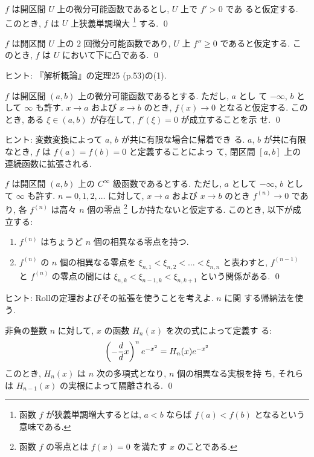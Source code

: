 \documentclass[12pt,twoside]{jarticle}
\begin{document}
\begin{question}
  $f$ は開区間 $U$ 上の微分可能函数であるとし, $U$ 上で $f' > 0$ であ
  ると仮定する. このとき, $f$ は $U$ 上狭義単調増大%
  \footnote{函数 $f$ が狭義単調増大するとは, $a < b$ ならば $f(a) <
    f(b)$ となるという意味である.}%
  する. \qed
\end{question}

\begin{question}
  $f$ は開区間 $U$ 上の $2$ 回微分可能函数であり, $U$ 上 $f'' \ge 0$ %
  であると仮定する. このとき, $f$ は $U$ において下に凸である. \qed
\end{question}

\noindent ヒント: 『解析概論』の定理25 (p.53)の(1).

\begin{question}[Rollの定理の拡張]
  $f$ は開区間 $(a,b)$ 上の微分可能函数であるとする. ただし, $a$ とし
  て $-\infty$, $b$ として $\infty$ も許す. 
  $x\to a$ および $x\to b$ のとき, $f(x)\to 0$ となると仮定する. この
  とき, ある $\xi\in(a,b)$ が存在して, $f'(\xi)=0$ が成立することを示
  せ. \qed
\end{question}

\noindent ヒント: 変数変換によって $a$, $b$ が共に有限な場合に帰着でき
る. $a$, $b$ が共に有限なとき, $f$ は $f(a)=f(b)=0$ と定義することによっ
て, 閉区間 $[a,b]$ 上の連続函数に拡張される.

\begin{question}\qstar{*}
  $f$ は開区間 $(a,b)$ 上の $C^\infty$ 級函数であるとする. ただし, $a$ 
  として $-\infty$, $b$ として $\infty$ も許す. %
  $n=0,1,2,\ldots$ に対して, $x\to a$ および $x\to b$ のとき %
  $f^{(n)} \to 0$ であり, 各 $f^{(n)}$ は高々 $n$ 個の零点%
  \footnote{函数 $f$ の零点とは $f(x)=0$ を満たす $x$ のことである.}%
  しか持たないと仮定する. このとき, 以下が成立する:
  \begin{enumerate}
  \item $f^{(n)}$ はちょうど $n$ 個の相異なる零点を持つ.
  \item $f^{(n)}$ の $n$ 個の相異なる零点を %
    $\xi_{n,1} < \xi_{n,2} < \dots < \xi_{n,n}$ と表わすと,
    $f^{(n-1)}$ と $f^{(n)}$ の零点の間には %
    $\xi_{n,k} < \xi_{n-1,k} < \xi_{n,k+1}$ という関係がある.  \qed
  \end{enumerate}
\end{question}

\noindent ヒント: Rollの定理およびその拡張を使うことを考えよ. $n$ に関
する帰納法を使う.

\begin{question}[Hermite多項式の零点の分布]
  非負の整数 $n$ に対して, $x$ の函数 $H_n(x)$ を次の式によって定義す
  る:
  \[
    \left( - \frac{d}{d }{x} \right)^n e^{-x^2} = H_n(x) e^{-x^2}
  \]%
  このとき, $H_n(x)$ は $n$ 次の多項式となり, $n$ 個の相異なる実根を持
  ち, それらは $H_{n-1}(x)$ の実根によって隔離される.
  \qed
\end{question}
\end{document}
